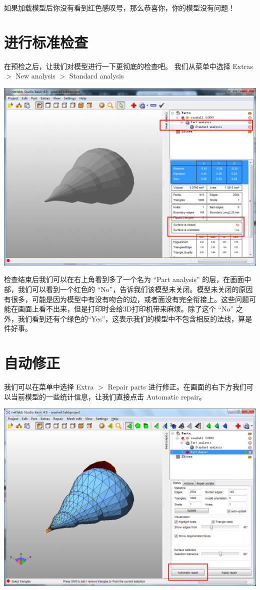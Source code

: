 \documentclass[10pt,a4paper]{article}
\begin{document}
\begin{CJK*}{UTF8}{song}
如果加载模型后你没有看到红色感叹号，那么恭喜你，你的模型没有问题！

\section{进行标准检查}
在预检之后，让我们对模型进行一下更彻底的检查吧。
我们从菜单中选择 Extras $ > $ New analysis $ > $ Standard analysis

\includegraphics[width=0.7\linewidth]{standardAnalysis}

检查结束后我们可以在右上角看到多了一个名为 “Part analysis” 的层，在画面中部，我们可以看到一个红色的 “No”，告诉我们该模型未关闭。模型未关闭的原因有很多，可能是因为模型中有没有吻合的边，或者面没有完全衔接上。这些问题可能在画面上看不出来，但是打印时会给3D打印机带来麻烦。除了这个 “No” 之外，我们看到还有个绿色的“Yes”，这表示我们的模型中不包含相反的法线，算是件好事。

\section{自动修正}
我们可以在菜单中选择 Extra $ > $ Repair parts 进行修正。在画面的右下方我们可以当前模型的一些统计信息，让我们直接点击 Automatic repair。

\includegraphics[width=0.7\linewidth]{automaticRepair}


\end{CJK*}
\end{document}
